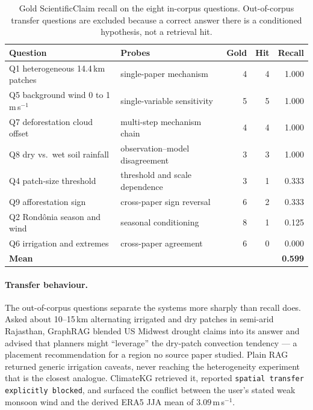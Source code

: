 \documentclass{article}
\begin{document}
\begin{table}[t]
\caption{Gold ScientificClaim recall on the eight in-corpus questions. Out-of-corpus
transfer questions are excluded because a correct answer there is a conditioned
hypothesis, not a retrieval hit.}
\label{tab:query}
\centering
\small
\begin{tabular}{@{}llrrr@{}}
\toprule
\textbf{Question} & \textbf{Probes} & \textbf{Gold} & \textbf{Hit} & \textbf{Recall} \\
\midrule
Q1 heterogeneous 14.4\,km patches & single-paper mechanism & 4 & 4 & 1.000 \\
Q5 background wind 0 to 1\,m\,s$^{-1}$ & single-variable sensitivity & 5 & 5 & 1.000 \\
Q7 deforestation cloud offset & multi-step mechanism chain & 4 & 4 & 1.000 \\
Q8 dry vs.\ wet soil rainfall & observation--model disagreement & 3 & 3 & 1.000 \\
Q4 patch-size threshold & threshold and scale dependence & 3 & 1 & 0.333 \\
Q9 afforestation sign & cross-paper sign reversal & 6 & 2 & 0.333 \\
Q2 Rond\^onia season and wind & seasonal conditioning & 8 & 1 & 0.125 \\
Q6 irrigation and extremes & cross-paper agreement & 6 & 0 & 0.000 \\
\midrule
\textbf{Mean} & & & & \textbf{0.599} \\
\bottomrule
\end{tabular}
\end{table}

\paragraph{Transfer behaviour.}
The out-of-corpus questions separate the systems more sharply than recall does. Asked
about 10--15\,km alternating irrigated and dry patches in semi-arid Rajasthan, GraphRAG
blended US Midwest drought claims into its answer and advised that planners might
``leverage'' the dry-patch convection tendency --- a placement recommendation for a
region no source paper studied. Plain RAG returned generic irrigation caveats, never
reaching the heterogeneity experiment that is the closest analogue. ClimateKG retrieved
it, reported \texttt{spatial transfer explicitly blocked}, and surfaced the conflict
between the user's stated weak monsoon wind and the derived ERA5 JJA mean of
$3.09$\,m\,s$^{-1}$.
\end{document}
